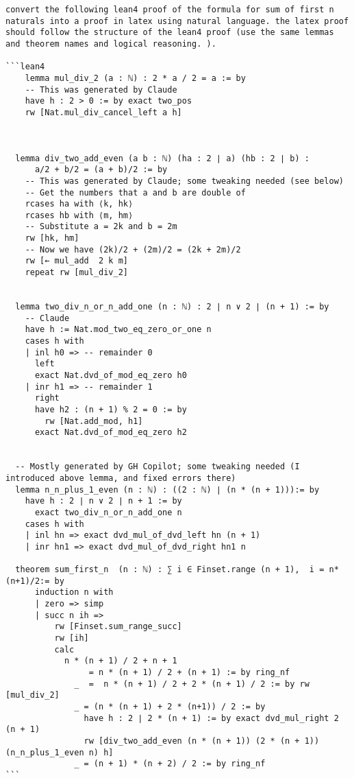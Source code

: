 \begin{verbatim}
convert the following lean4 proof of the formula for sum of first n naturals into a proof in latex using natural language. the latex proof should follow the structure of the lean4 proof (use the same lemmas and theorem names and logical reasoning. ).

```lean4    
    lemma mul_div_2 (a : ℕ) : 2 * a / 2 = a := by
    -- This was generated by Claude
    have h : 2 > 0 := by exact two_pos
    rw [Nat.mul_div_cancel_left a h]
  
  
  
  lemma div_two_add_even (a b : ℕ) (ha : 2 ∣ a) (hb : 2 ∣ b) :
      a/2 + b/2 = (a + b)/2 := by
    -- This was generated by Claude; some tweaking needed (see below)
    -- Get the numbers that a and b are double of
    rcases ha with ⟨k, hk⟩
    rcases hb with ⟨m, hm⟩
    -- Substitute a = 2k and b = 2m
    rw [hk, hm]
    -- Now we have (2k)/2 + (2m)/2 = (2k + 2m)/2
    rw [← mul_add  2 k m]
    repeat rw [mul_div_2]
  
  
  lemma two_div_n_or_n_add_one (n : ℕ) : 2 ∣ n ∨ 2 ∣ (n + 1) := by
    -- Claude
    have h := Nat.mod_two_eq_zero_or_one n
    cases h with
    | inl h0 => -- remainder 0
      left
      exact Nat.dvd_of_mod_eq_zero h0
    | inr h1 => -- remainder 1
      right
      have h2 : (n + 1) % 2 = 0 := by
        rw [Nat.add_mod, h1]
      exact Nat.dvd_of_mod_eq_zero h2
  
  
  -- Mostly generated by GH Copilot; some tweaking needed (I introduced above lemma, and fixed errors there)
  lemma n_n_plus_1_even (n : ℕ) : ((2 : ℕ) ∣ (n * (n + 1))):= by
    have h : 2 ∣ n ∨ 2 ∣ n + 1 := by
      exact two_div_n_or_n_add_one n
    cases h with
    | inl hn => exact dvd_mul_of_dvd_left hn (n + 1)
    | inr hn1 => exact dvd_mul_of_dvd_right hn1 n
  
  theorem sum_first_n  (n : ℕ) : ∑ i ∈ Finset.range (n + 1),  i = n*(n+1)/2:= by
      induction n with
      | zero => simp
      | succ n ih =>
          rw [Finset.sum_range_succ]
          rw [ih]
          calc
            n * (n + 1) / 2 + n + 1
                 = n * (n + 1) / 2 + (n + 1) := by ring_nf
              _  =  n * (n + 1) / 2 + 2 * (n + 1) / 2 := by rw [mul_div_2]
              _ = (n * (n + 1) + 2 * (n+1)) / 2 := by
                have h : 2 ∣ 2 * (n + 1) := by exact dvd_mul_right 2 (n + 1)
                rw [div_two_add_even (n * (n + 1)) (2 * (n + 1)) (n_n_plus_1_even n) h]
              _ = (n + 1) * (n + 2) / 2 := by ring_nf    
```
\end{verbatim}
